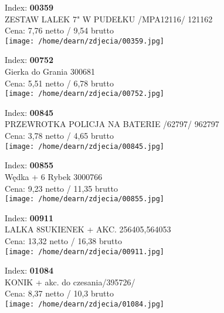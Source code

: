 {Index: \textbf{00359}\\
ZESTAW LALEK 7" W PUDEŁKU /MPA12116/            121162\\
Cena: 7,76 netto / 9,54 brutto\\
  \texttt{[image: /home/dearn/zdjecia/00359.jpg]}}\newline\newline

{Index: \textbf{00752}\\
Gierka do Grania 300681\\
Cena: 5,51 netto / 6,78 brutto\\
  \texttt{[image: /home/dearn/zdjecia/00752.jpg]}}\newline\newline

{Index: \textbf{00845}\\
PRZEWROTKA  POLICJA NA BATERIE  /62797/         962797\\
Cena: 3,78 netto / 4,65 brutto\\
  \texttt{[image: /home/dearn/zdjecia/00845.jpg]}}\newline\newline

{Index: \textbf{00855}\\
Wędka + 6 Rybek 3000766\\
Cena: 9,23 netto / 11,35 brutto\\
  \texttt{[image: /home/dearn/zdjecia/00855.jpg]}}\newline\newline

{Index: \textbf{00911}\\
LALKA 8SUKIENEK + AKC. 256405,564053\\
Cena: 13,32 netto / 16,38 brutto\\
  \texttt{[image: /home/dearn/zdjecia/00911.jpg]}}\newline\newline

{Index: \textbf{01084}\\
KONIK + akc. do czesania/395726/\\
Cena: 8,37 netto / 10,3 brutto\\
  \texttt{[image: /home/dearn/zdjecia/01084.jpg]}}\newline\newline

